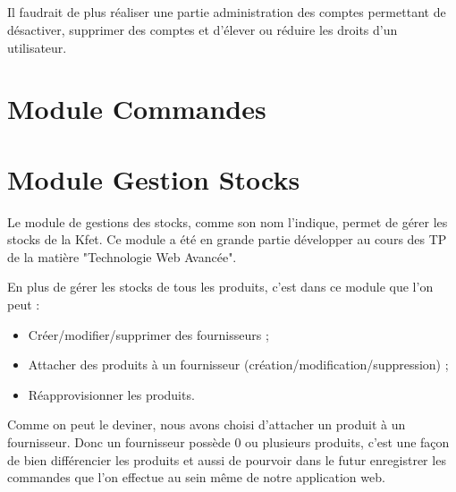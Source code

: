 \documentclass[twoside,UTF8]{EPURapport}
\begin{document}
        \paragraph{}Il faudrait de plus réaliser une partie administration des comptes permettant de désactiver, supprimer des comptes et d'élever ou réduire les droits d'un utilisateur.

\chapter{Module Commandes}

\chapter{Module Gestion Stocks}

Le module de gestions des stocks, comme son nom l'indique, permet de gérer les stocks de la Kfet. Ce module a été en grande partie développer au cours des TP de la matière "Technologie Web Avancée".

En plus de gérer les stocks de tous les produits, c'est dans ce module que l'on peut :
\begin{itemize}
    \item Créer/modifier/supprimer des fournisseurs ;
    \item Attacher des produits à un fournisseur (création/modification/suppression) ;
    \item Réapprovisionner les produits.
\end{itemize}

Comme on peut le deviner, nous avons choisi d'attacher un produit à un fournisseur. Donc un fournisseur possède 0 ou plusieurs produits, c'est une façon de bien différencier les produits et aussi de pourvoir dans le futur enregistrer les commandes que l'on effectue au sein même de notre application web.
\end{document}
